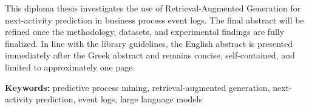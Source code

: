 
\noindent
This diploma thesis investigates the use of Retrieval-Augmented Generation for next-activity prediction in business process event logs. The final abstract will be refined once the methodology, datasets, and experimental findings are fully finalized. In line with the library guidelines, the English abstract is presented immediately after the Greek abstract and remains concise, self-contained, and limited to approximately one page.

\vspace{1cm}
\flushleft \textbf{Keywords:} predictive process mining, retrieval-augmented generation, next-activity prediction, event logs, large language models
\blankpage
